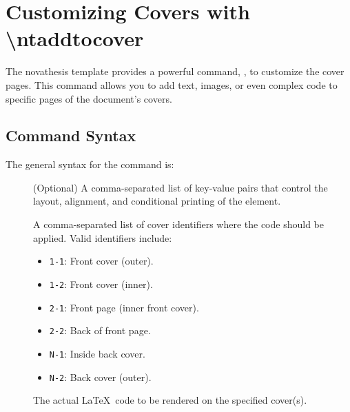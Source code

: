 
%

\chapter{Customizing Covers with \textbackslash ntaddtocover}
\label{cha:ntaddtocover}

The \gls{novathesis} template provides a powerful command, \latexinline{\ntaddtocover}, to customize the cover pages. This command allows you to add text, images, or even complex \latexinline{\TikZ} code to specific pages of the document's covers.

\section{Command Syntax}
\label{sec:syntax}

The general syntax for the command is:
\begin{center}
\end{center}

\begin{description}
  \item[] (Optional) A comma-separated list of key-value pairs that control the layout, alignment, and conditional printing of the element.
  \item[] A comma-separated list of cover identifiers where the code should be applied. Valid identifiers include:
    \begin{itemize}
      \item \texttt{1-1}: Front cover (outer).
      \item \texttt{1-2}: Front cover (inner).
      \item \texttt{2-1}: Front page (inner front cover).
      \item \texttt{2-2}: Back of front page.
      \item \texttt{N-1}: Inside back cover.
      \item \texttt{N-2}: Back cover (outer).
    \end{itemize}
  \item[] The actual \LaTeX\ code to be rendered on the specified cover(s).
\end{description}

